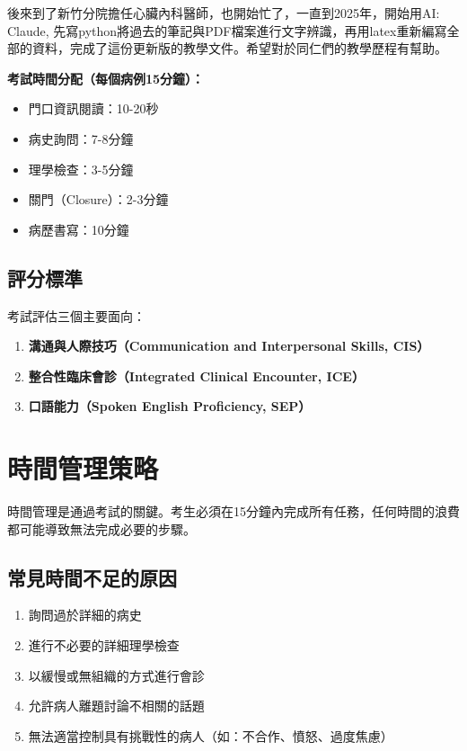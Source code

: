 \documentclass[12pt,a4paper]{article}
\newcommand{\note}[1]{
    \par
    \noindent
    \begin{tcolorbox}[
        colback=emergency_blue!5!white,
        colframe=emergency_blue,
        title=\textbf{重點提醒},
        fonttitle=\bfseries,
        boxrule=0.5pt,
        arc=3pt,
        left=6pt,
        right=6pt,
        top=6pt,
        bottom=6pt
    ]
    #1
    \end{tcolorbox}
}
\begin{document}
後來到了新竹分院擔任心臟內科醫師，也開始忙了，一直到2025年，開始用AI: Claude, 先寫python將過去的筆記與PDF檔案進行文字辨識，再用latex重新編寫全部的資料，完成了這份更新版的教學文件。希望對於同仁們的教學歷程有幫助。



\begin{importantbox}
\textbf{考試時間分配（每個病例15分鐘）：}
\begin{itemize}
    \item 門口資訊閱讀：10-20秒
    \item 病史詢問：7-8分鐘
    \item 理學檢查：3-5分鐘
    \item 關門（Closure）：2-3分鐘
    \item 病歷書寫：10分鐘
\end{itemize}
\end{importantbox}

\subsection{評分標準}

考試評估三個主要面向：
\begin{enumerate}
    \item \textbf{溝通與人際技巧（Communication and Interpersonal Skills, CIS）}
    \item \textbf{整合性臨床會診（Integrated Clinical Encounter, ICE）}
    \item \textbf{口語能力（Spoken English Proficiency, SEP）}
\end{enumerate}

\section{時間管理策略}

\note{時間管理是通過考試的關鍵。考生必須在15分鐘內完成所有任務，任何時間的浪費都可能導致無法完成必要的步驟。}

\subsection{常見時間不足的原因}

\begin{enumerate}
    \item 詢問過於詳細的病史
    \item 進行不必要的詳細理學檢查
    \item 以緩慢或無組織的方式進行會診
    \item 允許病人離題討論不相關的話題
    \item 無法適當控制具有挑戰性的病人（如：不合作、憤怒、過度焦慮）
\end{enumerate}
\end{document}
